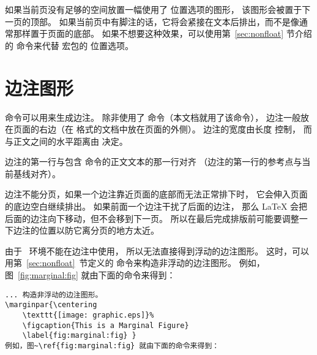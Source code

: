 如果当前页没有足够的空间放置一幅使用了 \opt{[H]} 位置选项的图形，
该图形会被置于下一页的顶部。
如果当前页中有脚注的话，它将会紧接在文本后排出，而不是像通常那样置于页面的底部。
如果不想要这种效果，可以使用第~\ref{sec:nonfloat} 节介绍的  命令来代替  宏包的 \opt{[H]} 位置选项。


\section{边注图形}\label{sec:marginfigure}

 命令可以用来生成边注。
除非使用了  命令（本文档就用了该命令），
边注一般放在页面的右边（在  格式的文档中放在页面的外侧）。
边注的宽度由长度  控制，
而与正文之间的水平距离由  决定。

边注的第一行与包含  命令的正文文本的那一行对齐
（边注的第一行的参考点与当前基线对齐）。

边注不能分页，如果一个边注靠近页面的底部而无法正常排下时，
它会伸入页面的底边空白继续排出。
如果前面一个边注干扰了后面的边注，
那么 \LaTeX{} 会把后面的边注向下移动，但不会移到下一页。
所以在最后完成排版前可能要调整一下边注的位置以防它离分页的地方太近。

由于 ~环境不能在边注中使用，
所以无法直接得到浮动的边注图形。
这时，可以用第~\ref{sec:nonfloat}~节定义的  命令来构造非浮动的边注图形。
例如，图~\ref{fig:marginal:fig} 就由下面的命令来得到：
\begin{lstlisting}
... 构造非浮动的边注图形。
\marginpar{\centering 
	\texttt{[image: graphic.eps]}% 
	\figcaption{This is a Marginal Figure} 
	\label{fig:marginal:fig} }
例如，图~\ref{fig:marginal:fig} 就由下面的命令来得到：
\end{lstlisting}

